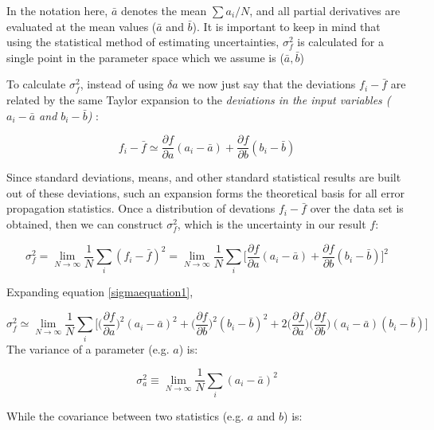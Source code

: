  In the notation here, $\bar a$ denotes the mean $\sum a_i/N$, and all partial derivatives are evaluated at the mean values ($\bar a$ and $ \bar b$). It is important to keep in mind that using the statistical method of estimating uncertainties, $\sigma_f^2$ is calculated for a single point in the parameter space which we assume is ($\bar a , \bar b$)


To calculate $\sigma_f^2$, instead of using $\delta a$ we now just say that the deviations $f_i - \bar f$ are related by the same Taylor expansion to the {\it deviations in the input variables ($a_i - \bar a$ and $b_i - \bar b$) }:

\begin{equation}
f_i - \bar f \simeq \frac{\partial f}{\partial a} (a_i - \bar a) + \frac{\partial f}{\partial b} (b_i - \bar b)
\end{equation}


Since standard deviations, means, and other standard statistical results are built out of these deviations, such an expansion forms the theoretical basis for all error propagation statistics. Once a distribution of devations $f_i - \bar f$ over the data set is obtained, then we can construct $\sigma_f^2$, which is the uncertainty in our result $f$:

\begin{equation}
\sigma_f^2 = \lim_{N \to \infty}  \frac{1}{N} \sum_i ( f_i - \bar f)^2 = \lim_{N \to \infty}  \frac{1}{N} \sum_i \bigg [ \frac{\partial f}{\partial a} (a_i - \bar a) + \frac{\partial f}{\partial b} (b_i - \bar b) \bigg]^2
\label{sigmaequation1}
\end{equation}

Expanding equation \ref{sigmaequation1},

\begin{equation}
\sigma_f^2 \simeq \lim_{N \to \infty}  \frac{1}{N} \sum_i \bigg [ \bigg ( \frac{\partial f}{\partial a}\bigg )^2 (a_i - \bar a)^2 + \bigg (\frac{\partial f}{\partial b}\bigg )^2 (b_i - \bar b)^2  +  2 \bigg ( \frac{\partial f}{\partial a}\bigg )  \bigg ( \frac{\partial f}{\partial b}\bigg ) (a_i - \bar a)(b_i - \bar b) \bigg]
\label{sigmaequation2}
\end{equation}
The variance of a parameter (e.g. $a$) is:

\begin{equation}\label{variance}
\sigma_a^2 \equiv \lim_{N \to \infty}  \frac{1}{N} \sum_i (a_i - \bar a)^2 
\end{equation}

While the covariance between two statistics (e.g. $a$ and $b$) is:

